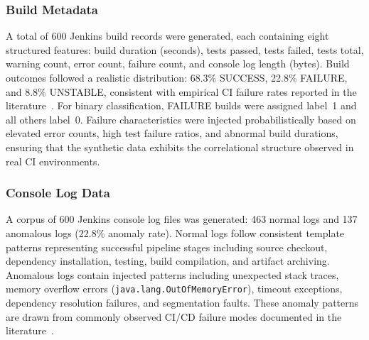 \documentclass[a4paper,fleqn]{cas-dc}
\begin{document}
\subsubsection{Build Metadata}
A total of 600 Jenkins build records were generated, each containing eight structured features: build duration (seconds), tests passed, tests failed, tests total, warning count, error count, failure count, and console log length (bytes).
Build outcomes followed a realistic distribution: 68.3\% SUCCESS, 22.8\% FAILURE, and 8.8\% UNSTABLE, consistent with empirical CI failure rates reported in the literature~\citep{rausch2017empirical}.
For binary classification, FAILURE builds were assigned label~1 and all others label~0.
Failure characteristics were injected probabilistically based on elevated error counts, high test failure ratios, and abnormal build durations, ensuring that the synthetic data exhibits the correlational structure observed in real CI environments.

\subsubsection{Console Log Data}
A corpus of 600 Jenkins console log files was generated: 463 normal logs and 137 anomalous logs (22.8\% anomaly rate).
Normal logs follow consistent template patterns representing successful pipeline stages including source checkout, dependency installation, testing, build compilation, and artifact archiving.
Anomalous logs contain injected patterns including unexpected stack traces, memory overflow errors (\texttt{java.lang.OutOfMemoryError}), timeout exceptions, dependency resolution failures, and segmentation faults.
These anomaly patterns are drawn from commonly observed CI/CD failure modes documented in the literature~\citep{he2016experience, xu2009logmining}.
\end{document}
